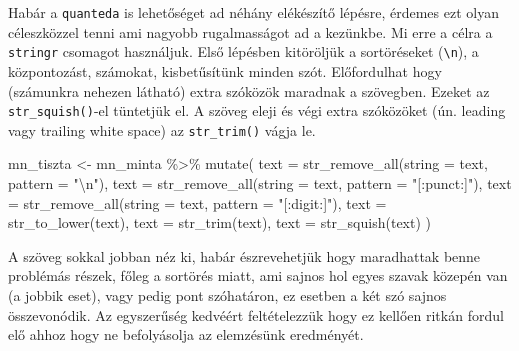 \documentclass[
]{book}
\newenvironment{Shaded}{\begin{snugshade}}{\end{snugshade}}
\newcommand{\AttributeTok}[1]{\textcolor[rgb]{0.77,0.63,0.00}{#1}}
\newcommand{\CommentTok}[1]{\textcolor[rgb]{0.56,0.35,0.01}{\textit{#1}}}
\newcommand{\DecValTok}[1]{\textcolor[rgb]{0.00,0.00,0.81}{#1}}
\newcommand{\FunctionTok}[1]{\textcolor[rgb]{0.00,0.00,0.00}{#1}}
\newcommand{\NormalTok}[1]{#1}
\newcommand{\OtherTok}[1]{\textcolor[rgb]{0.56,0.35,0.01}{#1}}
\newcommand{\SpecialCharTok}[1]{\textcolor[rgb]{0.00,0.00,0.00}{#1}}
\newcommand{\StringTok}[1]{\textcolor[rgb]{0.31,0.60,0.02}{#1}}
\begin{document}
Habár a \texttt{quanteda} is lehetőséget ad néhány elékészítő lépésre,
érdemes ezt olyan céleszközzel tenni ami nagyobb rugalmasságot ad a
kezünkbe. Mi erre a célra a \texttt{stringr} csomagot használjuk. Első
lépésben kitöröljük a sortöréseket (\texttt{\textbackslash{}n}), a
központozást, számokat, kisbetűsítünk minden szót. Előfordulhat hogy
(számunkra nehezen látható) extra szóközök maradnak a szövegben. Ezeket
az \texttt{str\_squish()}-el tüntetjük el. A szöveg eleji és végi extra
szóközöket (ún. leading vagy trailing white space) az
\texttt{str\_trim()} vágja le.

\begin{Shaded}
\begin{Highlighting}[]
\NormalTok{mn\_tiszta }\OtherTok{\textless{}{-}}\NormalTok{ mn\_minta }\SpecialCharTok{\%\textgreater{}\%}
  \FunctionTok{mutate}\NormalTok{(}
    \AttributeTok{text =} \FunctionTok{str\_remove\_all}\NormalTok{(}\AttributeTok{string =}\NormalTok{ text, }\AttributeTok{pattern =} \StringTok{"}\SpecialCharTok{\textbackslash{}n}\StringTok{"}\NormalTok{),}
    \AttributeTok{text =} \FunctionTok{str\_remove\_all}\NormalTok{(}\AttributeTok{string =}\NormalTok{ text, }\AttributeTok{pattern =} \StringTok{"[:punct:]"}\NormalTok{),}
    \AttributeTok{text =} \FunctionTok{str\_remove\_all}\NormalTok{(}\AttributeTok{string =}\NormalTok{ text, }\AttributeTok{pattern =} \StringTok{"[:digit:]"}\NormalTok{),}
    \AttributeTok{text =} \FunctionTok{str\_to\_lower}\NormalTok{(text),}
    \AttributeTok{text =} \FunctionTok{str\_trim}\NormalTok{(text),}
    \AttributeTok{text =} \FunctionTok{str\_squish}\NormalTok{(text)}
\NormalTok{  )}
\end{Highlighting}
\end{Shaded}

A szöveg sokkal jobban néz ki, habár észrevehetjük hogy maradhattak
benne problémás részek, főleg a sortörés miatt, ami sajnos hol egyes
szavak közepén van (a jobbik eset), vagy pedig pont szóhatáron, ez
esetben a két szó sajnos összevonódik. Az egyszerűség kedvéért
feltételezzük hogy ez kellően ritkán fordul elő ahhoz hogy ne
befolyásolja az elemzésünk eredményét.

\begin{Shaded}
\end{Shaded}
\end{document}
